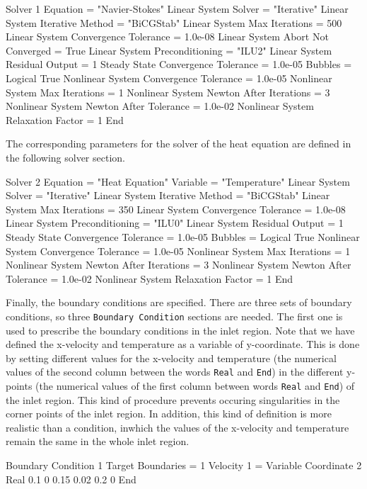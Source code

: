 \begin{flushleft}
\ttbegin
Solver 1
  Equation = "Navier-Stokes"
  Linear System Solver = "Iterative"
  Linear System Iterative Method = "BiCGStab"
  Linear System Max Iterations = 500
  Linear System Convergence Tolerance = 1.0e-08
  Linear System Abort Not Converged = True
  Linear System Preconditioning = "ILU2"
  Linear System Residual Output = 1
  Steady State Convergence Tolerance = 1.0e-05
  Bubbles = Logical True
  Nonlinear System Convergence Tolerance = 1.0e-05
  Nonlinear System Max Iterations = 1
  Nonlinear System Newton After Iterations = 3
  Nonlinear System Newton After Tolerance = 1.0e-02
  Nonlinear System Relaxation Factor = 1
End
\ttend

The corresponding parameters for the solver of the heat equation are defined in the following solver section.

\ttbegin
Solver 2
  Equation = "Heat Equation"
  Variable = "Temperature"
  Linear System Solver = "Iterative"
  Linear System Iterative Method = "BiCGStab"
  Linear System Max Iterations = 350
  Linear System Convergence Tolerance = 1.0e-08
  Linear System Preconditioning = "ILU0"
  Linear System Residual Output = 1
  Steady State Convergence Tolerance = 1.0e-05
  Bubbles = Logical True
  Nonlinear System Convergence Tolerance = 1.0e-05
  Nonlinear System Max Iterations = 1
  Nonlinear System Newton After Iterations = 3
  Nonlinear System Newton After Tolerance = 1.0e-02
  Nonlinear System Relaxation Factor = 1
End
\ttend

Finally, the boundary conditions are specified. There are three sets of boundary conditions, so three {\tt Boundary Condition} sections are needed. The first one is used to prescribe the boundary conditions in the inlet region. Note that we have defined the x-velocity and temperature as a variable of y-coordinate. 
This is done by setting different values for the x-velocity and temperature 
(the numerical values of the second column between the words {\tt Real} and {\tt End})
in the different y-points
(the numerical values of the first column between words {\tt Real} and {\tt End})
of the inlet region.
This kind of procedure prevents occuring singularities in the corner points of the inlet region. In addition, this kind of definition is more realistic than a condition, inwhich the values of the x-velocity and temperature remain the same in the whole inlet region. 

\ttbegin
Boundary Condition 1
  Target Boundaries = 1
  Velocity 1 = Variable Coordinate 2
    Real 
      0.1    0
      0.15   0.02
      0.2    0
    End


\end{flushleft}

